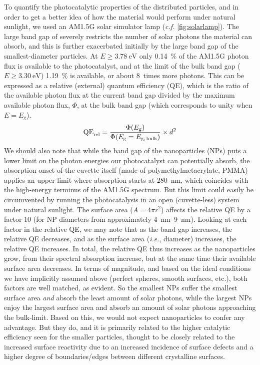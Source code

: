 \documentclass[9pt,twoside,twocolumn]{article}\usepackage{knitr}
\begin{document}
\begin{refsection}
To quantify the photocatalytic properties of the distributed particles, and in order to get a better idea of how the material would perform under natural sunlight, we used an AM1.5G solar simulator lamp (\textit{c.f.} \cref{fig:solarlamp}). \cite{ASTMG17303}
The large band gap of  severely restricts the number of solar photons the material can absorb, and this is further exacerbated initially by the large band gap of the smallest-diameter particles.
At $E\geqslant\qty{3.78}{\eV}$ only \qty{0.14}{\percent} of the AM1.5G photon flux is available to the  photocatalyst, and at the limit of the bulk band gap ($E\geqslant\qty{3.30}{\eV}$) \qty{1.19}{\percent} is available, or about 8~times more photons.
This can be expressed as a relative (external) quantum efficiency (QE), which is the ratio of the available photon flux at the current band gap divided by the maximum available photon flux, $\Phi$, at the bulk band gap (which corresponds to unity when $E = E_\text{g}$).
\begin{equation}\label{eq:relative-QE} %
\mathrm{QE}_\text{rel} = %
\frac{\Phi(E_\text{g})}{\Phi(E_\text{g} = E_\text{g,\,bulk})} \times d^2 
\end{equation}%
We should also note that while the band gap of the  nanoparticles (NPs) puts a lower limit on the photon energies our photocatalyst can potentially absorb, the absorption onset of the cuvette itself (made of polymethylmetacrylate, PMMA) applies an upper limit where absorption starts at \qty{280}{\nm}, which coincides with the high-energy terminus of the AM1.5G spectrum. But this limit could easily be circumvented by running the photocatalysis in an open (cuvette-less) system under natural sunlight.
The surface area ($A=4\pi r^2$) affects the relative QE by a factor \num{10} (for NP diameters from approximately \qtyrange{4}{9}{\nm}).
Looking at each factor in the relative QE, we may note that as the band gap increases, the relative QE decreases, and as the surface area (\textit{i.e.}, diameter) increases, the relative QE increases. 
In total, the relative QE thus increases as the nanoparticles grow, from their spectral absorption increase, but at the same time their available surface area decreases.
In terms of magnitude, and based on the ideal conditions we have implicitly assumed above (perfect spheres, smooth surfaces, etc.), both factors are well matched, as evident.
So the smallest  NPs suffer the smallest surface area \emph{and} absorb the least amount of solar photons, while the largest  NPs enjoy the largest surface area and absorb an amount of solar photons approaching the bulk-limit. Based on this, we would not expect nanoparticles to confer any advantage. But they do, and it is primarily related to the higher catalytic efficiency seen for the smaller particles, thought to be closely related to the increased surface reactivity due to an increased incidence of surface defects and a higher degree of boundaries/edges between different crystalline surfaces.





\end{refsection}
\end{document}
